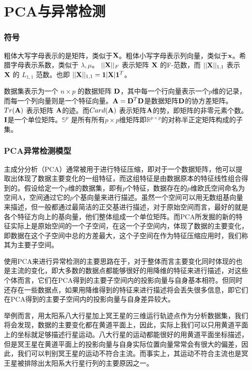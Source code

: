 \chapter{PCA与异常检测}
\subsection{符号}
粗体大写字母表示的是矩阵，类似于${\bf X}$。粗体小写字母表示列向量，类似于${\bf x}$。希腊字母表示系数，类似于 $\lambda,\mu$。 $||{\bf X}||_F$ 表示矩阵 ${\bf X}$ 的F-范数，而 $||{\bf X}||_{1,1}$ 表示 ${\bf X}$ 的 $L_{1,1}$ 范数。也即 $||{\bf X}||_{1,1} = {\bf 1}|{\bf X}|{\bf 1}^T$。

数据集表示为一个 $n \times p$ 的数据矩阵 ${\bf D}$，其中每一个行向量表示一个$p$维的记录，而每一个列向量则是一个特征向量。${\bf A} = {\bf D}^T{\bf D}$是数据矩阵${\bf D}$的协方差矩阵。$Tr({\bf A})$ 表示矩阵 ${\bf A}$的迹。而$Card({\bf A})$ 表示矩阵${\bf A}$的势，即矩阵的非零元素个数。${\bf I}$是一个单位矩阵。$\mathbb{S}^p$ 是所有所有$p \times p$维矩阵即$\mathbb{R}^{p \times p}$的对称半正定矩阵构成的子集。

\subsection{PCA异常检测模型}
主成分分析（PCA）通常被用于进行特征压缩，即对于一个数据矩阵，他可以提取出体现了数据主要变化的一组特征，而这组特征是由数据原本的特征线性组合得到的。假设给定一个$p$维的数据集，即有$p$个特征，数据存在的$p$维欧氏空间命名为空间A，空间通过它的$p$个基向量来进行描述。虽然一个空间可以用无数组基向量来描述，但一般都通过最简洁的正交基进行描述，对于原始空间而言，最好的就是各个特征方向上的基向量，他们整体组成一个单位矩阵。而PCA所发掘的新的特征实际上是原始空间的一个子空间，在这一个子空间内，体现了数据的主要变化，即数据在这个子空间中总的方差最大，这个子空间在作为特征压缩应用时，我们称其为主要子空间。

使用PCA来进行异常检测的主要思路在于，对于整体而言主要变化同时体现的也是主流的变化，即大多数的数据点都能够很好的用降维的特征来进行描述，对这些个体而言，它们在PCA得到的主要子空间内的投影向量与自身基本相符。但同时还存在一些数据点，如果用降维得到的特征来进行描述将会丢失很多信息，即它们在PCA得到的主要子空间内的投影向量与自身差异较大。

举例而言，用太阳系八大行星加上冥王星的三维运行轨迹点作为分析数据集，我们将会发现，数据的主要变化都在黄道平面上，因此，实际上我们可以只用黄道平面上的坐标就足够描述行星运动。八大行星的运动都能很好的用黄道平面坐标描述，但是冥王星在黄道平面上的投影向量与自身实际位置向量常常会有很大的偏差，因此，我们可以判别冥王星的运动不符合主流。而事实上，其运动不符合主流也是冥王星被排除出太阳系大行星行列的主要原因之一。

